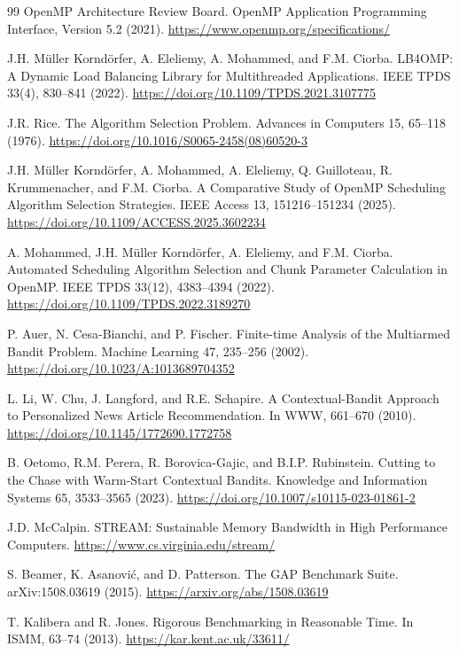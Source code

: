 \documentclass[10pt,letterpaper]{article}
\begin{document}
\begin{thebibliography}{99}\small
{} OpenMP Architecture Review Board.
OpenMP Application Programming Interface, Version 5.2 (2021).
\url{https://www.openmp.org/specifications/}

 J.H. M\"uller Kornd\"orfer, A. Eleliemy, A. Mohammed,
and F.M. Ciorba. LB4OMP: A Dynamic Load Balancing Library for Multithreaded
Applications. IEEE TPDS 33(4), 830--841 (2022).
\url{https://doi.org/10.1109/TPDS.2021.3107775}

 J.R. Rice. The Algorithm Selection Problem.
Advances in Computers 15, 65--118 (1976).
\url{https://doi.org/10.1016/S0065-2458(08)60520-3}

 J.H. M\"uller Kornd\"orfer, A. Mohammed, A. Eleliemy,
Q. Guilloteau, R. Krummenacher, and F.M. Ciorba. A Comparative Study of OpenMP
Scheduling Algorithm Selection Strategies. IEEE Access 13, 151216--151234
(2025). \url{https://doi.org/10.1109/ACCESS.2025.3602234}

 A. Mohammed, J.H. M\"uller Kornd\"orfer, A. Eleliemy,
and F.M. Ciorba. Automated Scheduling Algorithm Selection and Chunk Parameter
Calculation in OpenMP. IEEE TPDS 33(12), 4383--4394 (2022).
\url{https://doi.org/10.1109/TPDS.2022.3189270}

 P. Auer, N. Cesa-Bianchi, and P. Fischer.
Finite-time Analysis of the Multiarmed Bandit Problem. Machine Learning 47,
235--256 (2002). \url{https://doi.org/10.1023/A:1013689704352}

 L. Li, W. Chu, J. Langford, and R.E. Schapire.
A Contextual-Bandit Approach to Personalized News Article Recommendation.
In WWW, 661--670 (2010). \url{https://doi.org/10.1145/1772690.1772758}

 B. Oetomo, R.M. Perera, R. Borovica-Gajic, and
B.I.P. Rubinstein. Cutting to the Chase with Warm-Start Contextual Bandits.
Knowledge and Information Systems 65, 3533--3565 (2023).
\url{https://doi.org/10.1007/s10115-023-01861-2}

 J.D. McCalpin. STREAM: Sustainable Memory Bandwidth
in High Performance Computers. \url{https://www.cs.virginia.edu/stream/}

 S. Beamer, K. Asanovi\'c, and D. Patterson.
The GAP Benchmark Suite. arXiv:1508.03619 (2015).
\url{https://arxiv.org/abs/1508.03619}

 T. Kalibera and R. Jones.
Rigorous Benchmarking in Reasonable Time. In ISMM, 63--74 (2013).
\url{https://kar.kent.ac.uk/33611/}
\end{thebibliography}
\end{document}
